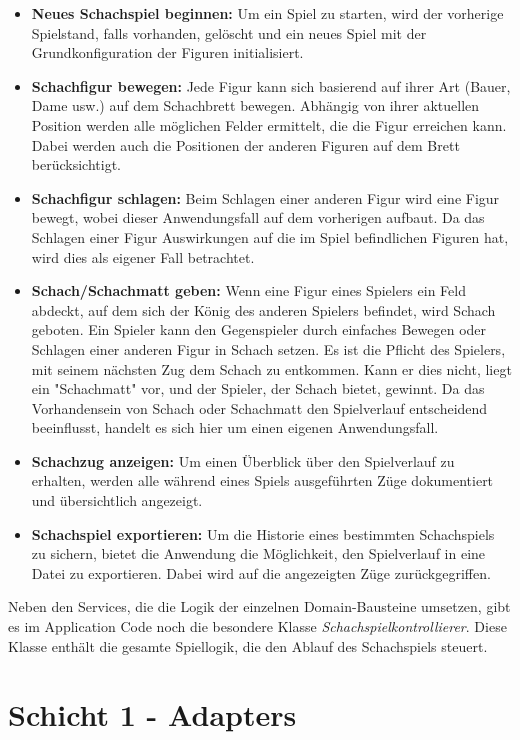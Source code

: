 \begin{itemize}
    \item \textbf{Neues Schachspiel beginnen:} Um ein Spiel zu starten, wird der vorherige Spielstand, falls vorhanden, gelöscht und ein neues Spiel mit der Grundkonfiguration der Figuren initialisiert.
    \item \textbf{Schachfigur bewegen:} Jede Figur kann sich basierend auf ihrer Art (Bauer, Dame usw.) auf dem Schachbrett bewegen. 
    Abhängig von ihrer aktuellen Position werden alle möglichen Felder ermittelt, die die Figur erreichen kann. 
    Dabei werden auch die Positionen der anderen Figuren auf dem Brett berücksichtigt.
    \item \textbf{Schachfigur schlagen:} Beim Schlagen einer anderen Figur wird eine Figur bewegt, wobei dieser Anwendungsfall auf dem vorherigen aufbaut. 
    Da das Schlagen einer Figur Auswirkungen auf die im Spiel befindlichen Figuren hat, wird dies als eigener Fall betrachtet.
    \item \textbf{Schach/Schachmatt geben:} Wenn eine Figur eines Spielers ein Feld abdeckt, auf dem sich der König des anderen Spielers befindet, wird Schach geboten. 
    Ein Spieler kann den Gegenspieler durch einfaches Bewegen oder Schlagen einer anderen Figur in Schach setzen. 
    Es ist die Pflicht des Spielers, mit seinem nächsten Zug dem Schach zu entkommen. 
    Kann er dies nicht, liegt ein "Schachmatt" vor, und der Spieler, der Schach bietet, gewinnt. 
    Da das Vorhandensein von Schach oder Schachmatt den Spielverlauf entscheidend beeinflusst, handelt es sich hier um einen eigenen Anwendungsfall.
    \item \textbf{Schachzug anzeigen:} Um einen Überblick über den Spielverlauf zu erhalten, werden alle während eines Spiels ausgeführten Züge dokumentiert und übersichtlich angezeigt.
    \item \textbf{Schachspiel exportieren:} Um die Historie eines bestimmten Schachspiels zu sichern, bietet die Anwendung die Möglichkeit, den Spielverlauf in eine Datei zu exportieren. Dabei wird auf die angezeigten Züge zurückgegriffen.
\end{itemize}

Neben den Services, die die Logik der einzelnen Domain-Bausteine umsetzen, gibt es im Application Code noch die besondere Klasse \textit{Schachspielkontrollierer}. 
Diese Klasse enthält die gesamte Spiellogik, die den Ablauf des Schachspiels steuert.

\newpage

\section{Schicht 1 - Adapters}

